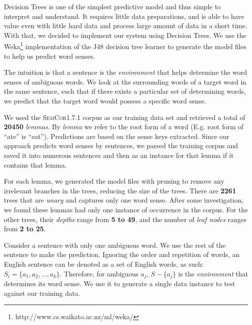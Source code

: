 \documentclass[a4paper,12pt]{nurop}
\begin{document}
Decision Trees is one of the simplest predictive model and thus simple to interpret and understand. It requires little data preparations, and is able to have value even with little hard data and process large amount of data in a short time. With that, we decided to implement our system using Decision Trees. We use the Weka\footnote{http://www.cs.waikato.ac.nz/ml/weka/} implementation of the J48 decision tree learner to generate the model files to help us predict word senses.

The intuition is that a sentence is the \textit{environment} that helps determine the word senses of ambiguous words. We look at the surrounding words of a target word in the same sentence, such that if there exists a particular set of determining words, we predict that the target word would possess a specific word sense.

We used the \textsc{SemCor1.7.1} corpus as our training data set and retrieved a total of \textbf{20450} \textit{lemmas}. By \textit{lemma} we refer to the root form of a word (E.g. root form of ``ate'' is ``eat''). Predictions are based on the sense keys extracted. Since our approach predicts word senses by sentences, we parsed the training corpus and saved it into numerous sentences and then as an instance for that lemma if it contains that lemma.

For each lemma, we generated the model files with pruning to remove any irrelevant branches in the trees, reducing the size of the trees. There are \textbf{2261} trees that are \textit{unary} and captures only one word sense. After some investigation, we found these lemmas had only one instance of occurrence in the corpus. For the other trees, their \textit{depths} range from \textbf{5 to 49}, and the number of \textit{leaf nodes} ranges from \textbf{2 to 25}.

Consider a sentence with only one ambiguous word. We use the rest of the sentence to make the prediction. Ignoring the order and repetition of words, an English sentence can be denoted as a set of English words, as such: $S_{i} = \{a_{1}, a_{2}, \ldots, a_{k}\}$. Therefore, for ambiguous $a_{j}$, $S - \{a_{j}\}$ is the \textit{environment} that determines its word sense. We use it to generate a single data instance to test against our training data.

\end{document}
